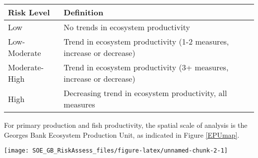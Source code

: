 \documentclass[11pt,]{article}
\let\origfigure\figure
\let\endorigfigure\endfigure
\renewenvironment{figure}[1][2] {
    \expandafter\origfigure\expandafter[H]
} {
    \endorigfigure
}
\begin{document}
\begin{longtable}[]{@{}ll@{}}
\toprule
\begin{minipage}[b]{0.22\columnwidth}\raggedright\strut
Risk Level\strut
\end{minipage} & \begin{minipage}[b]{0.72\columnwidth}\raggedright\strut
Definition\strut
\end{minipage}\tabularnewline
\midrule
\endhead
\begin{minipage}[t]{0.22\columnwidth}\raggedright\strut
Low\strut
\end{minipage} & \begin{minipage}[t]{0.72\columnwidth}\raggedright\strut
No trends in ecosystem productivity\strut
\end{minipage}\tabularnewline
\begin{minipage}[t]{0.22\columnwidth}\raggedright\strut
Low-Moderate\strut
\end{minipage} & \begin{minipage}[t]{0.72\columnwidth}\raggedright\strut
Trend in ecosystem productivity (1-2 measures, increase or
decrease)\strut
\end{minipage}\tabularnewline
\begin{minipage}[t]{0.22\columnwidth}\raggedright\strut
Moderate-High\strut
\end{minipage} & \begin{minipage}[t]{0.72\columnwidth}\raggedright\strut
Trend in ecosystem productivity (3+ measures, increase or
decrease)\strut
\end{minipage}\tabularnewline
\begin{minipage}[t]{0.22\columnwidth}\raggedright\strut
High\strut
\end{minipage} & \begin{minipage}[t]{0.72\columnwidth}\raggedright\strut
Decreasing trend in ecosystem productivity, all measures\strut
\end{minipage}\tabularnewline
\bottomrule
\end{longtable}

For primary production and fish productivity, the spatial scale of
analysis is the Georges Bank Ecosystem Production Unit, as indicated in
Figure \ref{EPUmap}.

\begin{figure}

{\centering \texttt{[image: SOE\_GB\_RiskAssess\_files/figure-latex/unnamed-chunk-2-1]} 

}

\caption{Northeast US Ecosystem Production units. \label{EPUmap}}\label{fig:unnamed-chunk-2}
\end{figure}
\end{document}
